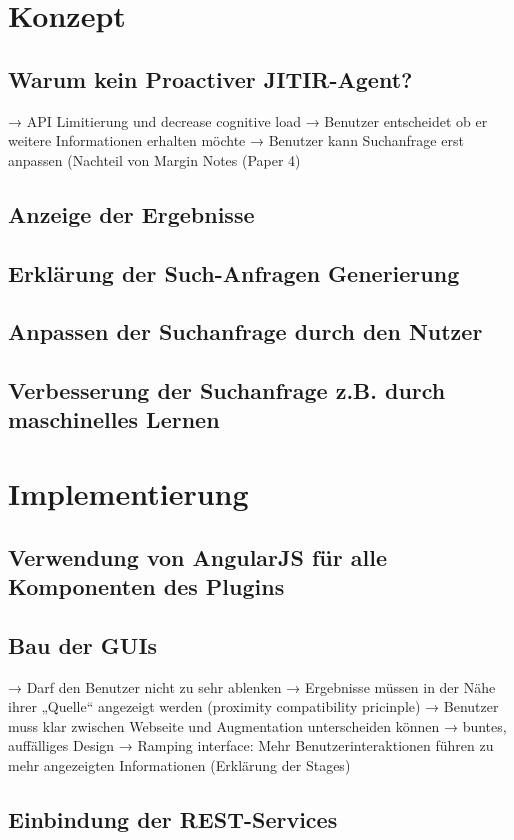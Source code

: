\section{Konzept}
 \subsection{Warum kein Proactiver JITIR-Agent?}
 	→ API Limitierung und decrease cognitive load 
	→ Benutzer entscheidet ob er weitere Informationen erhalten möchte
	→ Benutzer kann Suchanfrage erst anpassen (Nachteil von Margin Notes (Paper 4)
 \subsection{Anzeige der Ergebnisse}
 \subsection{Erklärung der Such-Anfragen Generierung}
 \subsection{Anpassen der Suchanfrage durch den Nutzer}
 \subsection{Verbesserung der Suchanfrage z.B. durch maschinelles Lernen}

\section{Implementierung}
 \subsection{Verwendung von AngularJS für alle Komponenten des Plugins}
 \subsection{Bau der GUIs}
		→ Darf den Benutzer nicht zu sehr ablenken
		→ Ergebnisse müssen in der Nähe ihrer „Quelle“ angezeigt werden (proximity compatibility pricinple)
		→ Benutzer muss klar zwischen Webseite und Augmentation unterscheiden können
		→ buntes, auffälliges Design
		→ Ramping interface: Mehr Benutzerinteraktionen führen zu mehr angezeigten Informationen (Erklärung der Stages) 
 \subsection{Einbindung der REST-Services}

